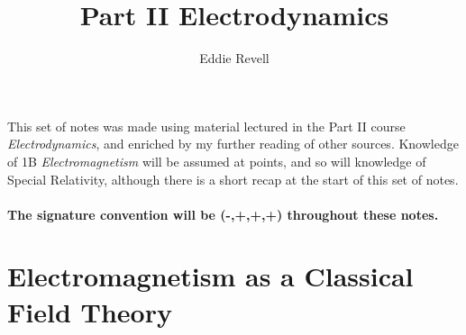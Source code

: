 \documentclass[a4paper]{article}
\title{\vspace{-5ex}Part II Electrodynamics}
\author{Eddie Revell}
\date{\vspace{-4ex}}
\numberwithin{equation}{section}
\begin{document}
\maketitle
\setlength{\parindent}{0cm}

This set of notes was made using material lectured in the Part II course \textit{Electrodynamics}, and enriched by my further reading of other sources. Knowledge of 1B \textit{Electromagnetism} will be assumed at points, and so will knowledge of Special Relativity, although there is a short recap at the start of this set of notes.\\
\\
\textbf{The signature convention will be (-,+,+,+) throughout these notes.}

\tableofcontents
\newpage

\section{Electromagnetism as a Classical Field Theory}
\end{document}
